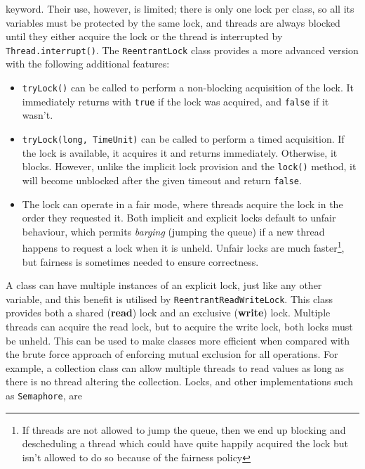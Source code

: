 \begin{itemize}
    keyword.  Their use, however, is limited; there is only one lock
    per class, so all its variables must be protected by the same
    lock, and threads are always blocked until they either acquire the
    lock or the thread is interrupted by \texttt{Thread.interrupt()}.
    The \texttt{ReentrantLock} class provides a more advanced version
    with the following additional features:
    \begin{itemize}
      \item \texttt{tryLock()} can be called to perform a non-blocking
        acquisition of the lock.  It immediately returns with
        \texttt{true} if the lock was acquired, and \texttt{false} if
        it wasn't.
      \item \texttt{tryLock(long, TimeUnit)} can be called to perform
        a timed acquisition.  If the lock is available, it acquires it
        and returns immediately.  Otherwise, it blocks.  However,
        unlike the implicit lock provision and the \texttt{lock()}
        method, it will become unblocked after the given timeout and
        return \texttt{false}.
        \item The lock can operate in a fair mode, where threads
          acquire the lock in the order they requested it.  Both
          implicit and explicit locks default to unfair behaviour,
          which permits \emph{barging} (jumping the queue) if a new
          thread happens to request a lock when it is unheld.  Unfair
          locks are much faster\footnote{If threads are not allowed to
            jump the queue, then we end up blocking and descheduling a
            thread which could have quite happily acquired the lock
            but isn't allowed to do so because of the fairness
            policy}, but fairness is sometimes needed to ensure
          correctness.
    \end{itemize}
    A class can have multiple instances of an explicit lock, just like
    any other variable, and this benefit is utilised by
    \texttt{ReentrantReadWriteLock}.  This class provides both a
    shared (\textbf{read}) lock and an exclusive (\textbf{write})
    lock.  Multiple threads can acquire the read lock, but to acquire
    the write lock, both locks must be unheld.  This can be used to
    make classes more efficient when compared with the brute force
    approach of enforcing mutual exclusion for all operations.  For
    example, a collection class can allow multiple threads to read
    values as long as there is no thread altering the collection.
    Locks, and other implementations such as \texttt{Semaphore}, are

\end{itemize}
